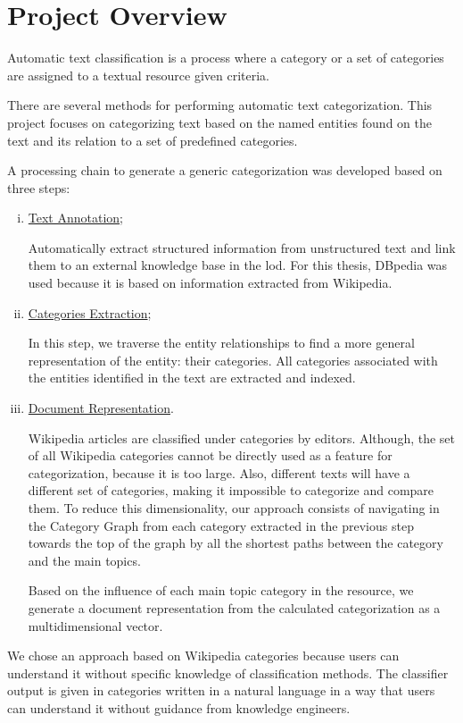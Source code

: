 \section{\hspace*{3pt} Project Overview}

Automatic text classification is a process where a category or a set of categories are assigned to a textual resource given criteria.

There are several methods for performing automatic text categorization. This project focuses on categorizing text based on the named entities found on the text and its relation to a set of predefined categories.

A processing chain to generate a generic categorization was developed based on three steps:

\begin{enumerate}[(i)]
\item \hyperref[sec:text-annotation]{Text Annotation};

Automatically extract structured information from unstructured text and link them to an external knowledge base in the \gls{lod}. For this thesis, DBpedia was used because it is based on information extracted from Wikipedia.

\item \hyperref[sec:categories-extraction]{Categories Extraction};

In this step, we traverse the entity relationships to find a more general representation of the entity: their categories. All categories associated with the entities identified in the text are extracted and indexed.

\item \hyperref[sec:doc-representation]{Document Representation}.

Wikipedia articles are classified under categories by editors. Although, the set of all Wikipedia categories cannot be directly used as a feature for categorization, because it is too large. Also,  different texts will have a different set of categories, making it impossible to categorize and compare them. To reduce this dimensionality, our approach consists of navigating in the Category Graph from each category extracted in the previous step towards the top of the graph by all the shortest paths between the category and the main topics. 

Based on the influence of each main topic category in the resource, we generate a document representation from the calculated categorization as a multidimensional vector.

\end{enumerate}
We chose an approach based on Wikipedia categories because users can understand it without specific knowledge of classification methods. The classifier output is given in categories written in a natural language in a way that users can understand it without guidance from knowledge engineers. 



